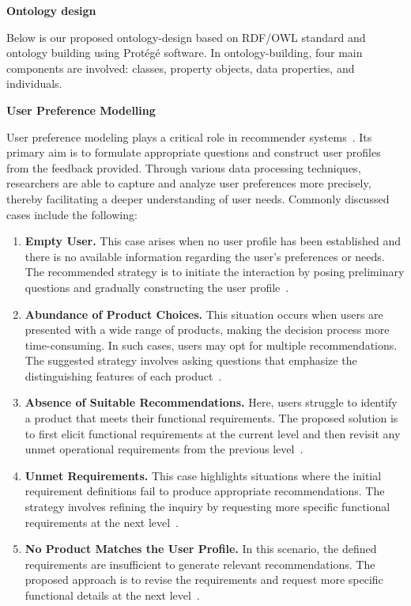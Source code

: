 \begin{flushleft}
	\textbf{Ontology design}
\end{flushleft}
Below is our proposed ontology-design based on RDF/OWL standard and ontology building using Protégé software. In ontology-building, four main components are involved: classes, property objects, data properties, and individuals. 


\begin{flushleft}
	\textbf{User Preference Modelling}
\end{flushleft}
User preference modeling plays a critical role in recommender systems~\parencite{ayundhita2019}. Its primary aim is to formulate appropriate questions and construct user profiles from the feedback provided. Through various data processing techniques, researchers are able to capture and analyze user preferences more precisely, thereby facilitating a deeper understanding of user needs. Commonly discussed cases include the following:

\begin{enumerate}[label=\alph*)]
	\item \textbf{Empty User.} This case arises when no user profile has been established and there is no available information regarding the user’s preferences or needs. The recommended strategy is to initiate the interaction by posing preliminary questions and gradually constructing the user profile~\parencite{ayundhita2019}.  
	
	\item \textbf{Abundance of Product Choices.} This situation occurs when users are presented with a wide range of products, making the decision process more time-consuming. In such cases, users may opt for multiple recommendations. The suggested strategy involves asking questions that emphasize the distinguishing features of each product~\parencite{ayundhita2019}.  
	
	\item \textbf{Absence of Suitable Recommendations.} Here, users struggle to identify a product that meets their functional requirements. The proposed solution is to first elicit functional requirements at the current level and then revisit any unmet operational requirements from the previous level~\parencite{ayundhita2019}.  
	
	\item \textbf{Unmet Requirements.} This case highlights situations where the initial requirement definitions fail to produce appropriate recommendations. The strategy involves refining the inquiry by requesting more specific functional requirements at the next level~\parencite{ayundhita2019}.  
	
	\item \textbf{No Product Matches the User Profile.} In this scenario, the defined requirements are insufficient to generate relevant recommendations. The proposed approach is to revise the requirements and request more specific functional details at the next level~\parencite{ayundhita2019}.  
\end{enumerate}

